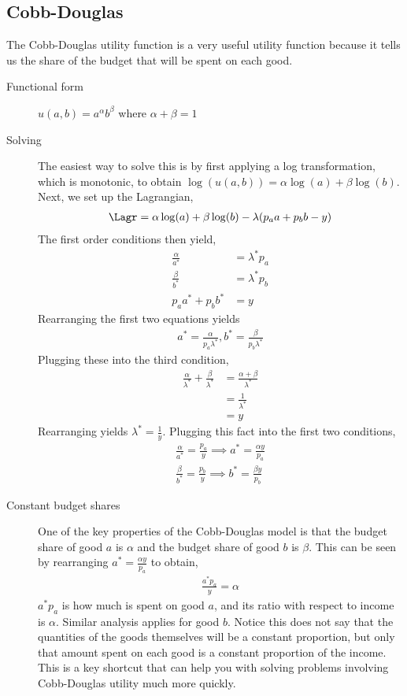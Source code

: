 \subsection*{Cobb-Douglas}
The Cobb-Douglas utility function is a very useful utility function because it tells us the share of the budget that will be spent on each good.
\begin{description}
    \item[Functional form] $u(a, b) = a^\alpha b^\beta$ where $\alpha + \beta = 1$
    \item[Solving] The easiest way to solve this is by first applying a log transformation, which is monotonic, to obtain $\log(u(a, b)) = \alpha \log(a) + \beta \log(b)$. Next, we set up the Lagrangian,
    \begin{align*}
        \Lagr = \alpha \log(a) + \beta \log(b) - \lambda (p_a a + p_b b - y)
    \end{align*} 
    The first order conditions then yield,
    \begin{align*}
        \frac{\alpha}{a^*} &= \lambda^* p_a \\
        \frac{\beta}{b^*} &= \lambda^* p_b \\
        p_a a^* + p_b b^* &= y
    \end{align*}
    Rearranging the first two equations yields
    \begin{align*}
        a^* = \frac{\alpha}{p_a \lambda^*}, b^* = \frac{\beta}{p_b \lambda^*}
    \end{align*}
    Plugging these into the third condition,
    \begin{align*}
        \frac{\alpha}{\lambda^*} + \frac{\beta}{\lambda^*} &= \frac{\alpha + \beta}{\lambda^*} \\
        &= \frac{1}{\lambda^*} \\
        &= y
    \end{align*}
    Rearranging yields $\lambda^* = \frac{1}{y}$. Plugging this fact into the first two conditions,
    \begin{align*}
        \frac{\alpha}{a^*} = \frac{p_a}{y} \implies a^* = \frac{\alpha y}{p_a} \\
        \frac{\beta}{b^*} = \frac{p_b}{y} \implies b^* = \frac{\beta y}{p_b}
    \end{align*}
    \item[Constant budget shares] One of the key properties of the Cobb-Douglas model is that the budget share of good $a$ is $\alpha$ and the budget share of good $b$ is $\beta$. This can be seen by rearranging $a^* = \frac{\alpha y}{p_a}$ to obtain,
    \begin{align*}
        \frac{a^* p_a}{y} = \alpha
    \end{align*} 
    $a^* p_a$ is how much is spent on good $a$, and its ratio with respect to income is $\alpha$. Similar analysis applies for good $b$. Notice this does not say that the quantities of the goods themselves will be a constant proportion, but only that amount spent on each good is a constant proportion of the income. This is a key shortcut that can help you with solving problems involving Cobb-Douglas utility much more quickly. 
\end{description}

